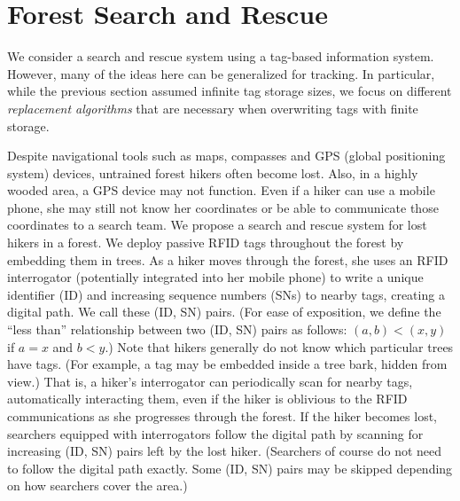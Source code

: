 \section{Forest Search and Rescue}
\label{Section: Tracking Protocols: Forest Search and Rescue}
We consider a search and rescue system using a tag-based information system. However, many of the ideas here can be generalized for tracking. In particular, while the previous section assumed infinite tag storage sizes, we focus on different \emph{replacement algorithms} that are necessary when overwriting tags with finite storage.

Despite navigational tools such as maps, compasses and GPS (global positioning system) devices, untrained forest hikers often become lost.  Also, in a highly wooded area, a GPS device may not function.  Even if a hiker can use a mobile phone, she may still not know her coordinates or be able to communicate those coordinates to a search team.  We propose a search and rescue system for lost hikers in a forest.  We deploy passive RFID tags throughout the forest by embedding them in trees.  As a hiker moves through the forest, she uses an RFID interrogator (potentially integrated into her mobile phone) to write a unique identifier (ID) and increasing sequence numbers (SNs) to nearby tags, creating a digital path.  We call these (ID, SN) pairs.  (For ease of exposition, we define the ``less than'' relationship between two (ID, SN) pairs as follows: $(a, b) < (x, y)$ if $a = x$ and $b < y$.)  Note that hikers generally do not know which particular trees have tags.  (For example, a tag may be embedded inside a tree bark, hidden from view.)  That is, a hiker's interrogator can periodically scan for nearby tags, automatically interacting them, even if the hiker is oblivious to the RFID communications as she progresses through the forest. If the hiker becomes lost, searchers equipped with interrogators follow the digital path by scanning for increasing (ID, SN) pairs left by the lost hiker.  (Searchers of course do not need to follow the digital path exactly.  Some (ID, SN) pairs may be skipped depending on how searchers cover the area.)  

